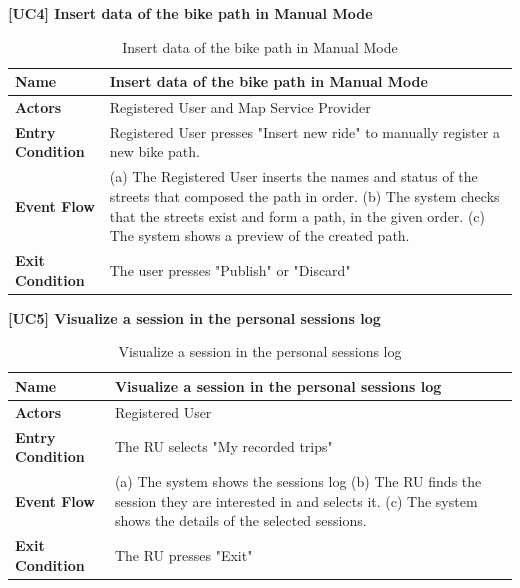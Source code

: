 \documentclass{article}
\begin{document}
\textbf{[UC4] Insert data of the bike path in Manual Mode}
\begin{table}[H]
    \centering
    \begin{tabularx}{\textwidth}{|l|X|}
        \hline
        \textbf{Name} & \textbf{Insert data of the bike path in Manual Mode} \\
        \hline
        \textbf{Actors} & Registered User and Map Service Provider\\
        \hline
        \textbf{Entry Condition} & Registered User presses "Insert new ride" to manually register a new bike path.\\
        \hline
        \textbf{Event Flow} & 
        (a) The Registered User inserts the names and status of the streets that composed the path in order.
        \vspace{0.2cm}
        \newline
        (b) The system checks that the streets exist and form a path, in the given order.
        \vspace{0.2cm}
        \newline
        (c) The system shows a preview of the created path.
        \\
        \hline
        \textbf{Exit Condition} & The user presses "Publish" or "Discard" \\
        \hline
    \end{tabularx}
    \caption{Insert data of the bike path in Manual Mode}
\end{table}

\newpage
\textbf{[UC5] Visualize a session in the personal sessions log}
\begin{table}[H]
    \centering
    \begin{tabularx}{\textwidth}{|l|X|}
        \hline
        \textbf{Name} & \textbf{Visualize a session in the personal sessions log} \\
        \hline
        \textbf{Actors} & Registered User\\
        \hline
        \textbf{Entry Condition} & The RU selects "My recorded trips"\\
        \hline
        \textbf{Event Flow} & 
        (a) The system shows the sessions log
        \vspace{0.2cm}
        \newline
        (b) The RU finds the session they are interested in and selects it.
        \vspace{0.2cm}
        \newline
        (c) The system shows the details of the selected sessions.
        \\
        \hline
        \textbf{Exit Condition} & The RU presses "Exit" \\
        \hline
    \end{tabularx}
    \caption{Visualize a session in the personal sessions log}
\end{table}
\end{document}
